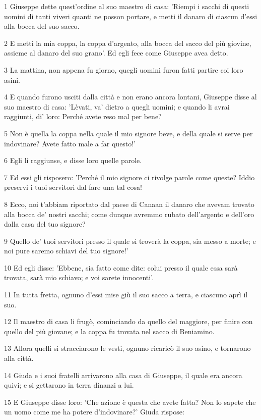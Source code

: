 \par 1 Giuseppe dette quest'ordine al suo maestro di casa: 'Riempi i sacchi di questi uomini di tanti viveri quanti ne posson portare, e metti il danaro di ciascun d'essi alla bocca del suo sacco.
\par 2 E metti la mia coppa, la coppa d'argento, alla bocca del sacco del più giovine, assieme al danaro del suo grano'. Ed egli fece come Giuseppe avea detto.
\par 3 La mattina, non appena fu giorno, quegli uomini furon fatti partire coi loro asini.
\par 4 E quando furono usciti dalla città e non erano ancora lontani, Giuseppe disse al suo maestro di casa: 'Lèvati, va' dietro a quegli uomini; e quando li avrai raggiunti, di' loro: Perché avete reso mal per bene?
\par 5 Non è quella la coppa nella quale il mio signore beve, e della quale si serve per indovinare? Avete fatto male a far questo!'
\par 6 Egli li raggiunse, e disse loro quelle parole.
\par 7 Ed essi gli risposero: 'Perché il mio signore ci rivolge parole come queste? Iddio preservi i tuoi servitori dal fare una tal cosa!
\par 8 Ecco, noi t'abbiam riportato dal paese di Canaan il danaro che avevam trovato alla bocca de' nostri sacchi; come dunque avremmo rubato dell'argento e dell'oro dalla casa del tuo signore?
\par 9 Quello de' tuoi servitori presso il quale si troverà la coppa, sia messo a morte; e noi pure saremo schiavi del tuo signore!'
\par 10 Ed egli disse: 'Ebbene, sia fatto come dite: colui presso il quale essa sarà trovata, sarà mio schiavo; e voi sarete innocenti'.
\par 11 In tutta fretta, ognuno d'essi mise giù il suo sacco a terra, e ciascuno aprì il suo.
\par 12 Il maestro di casa li frugò, cominciando da quello del maggiore, per finire con quello del più giovane; e la coppa fu trovata nel sacco di Beniamino.
\par 13 Allora quelli si stracciarono le vesti, ognuno ricaricò il suo asino, e tornarono alla città.
\par 14 Giuda e i suoi fratelli arrivarono alla casa di Giuseppe, il quale era ancora quivi; e si gettarono in terra dinanzi a lui.
\par 15 E Giuseppe disse loro: 'Che azione è questa che avete fatta? Non lo sapete che un uomo come me ha potere d'indovinare?' Giuda rispose:
